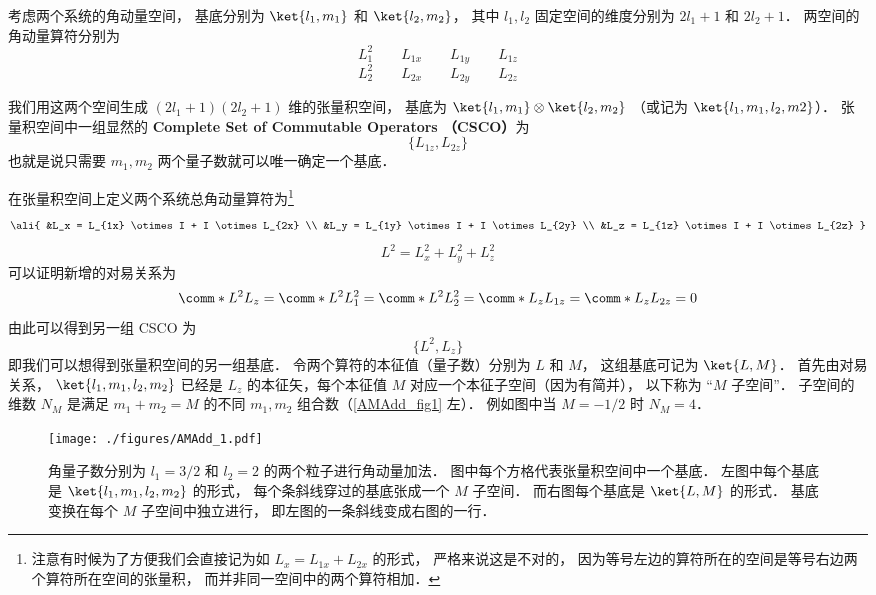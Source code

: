 

考虑两个系统的角动量空间， 基底分别为 $\ket{l_1, m_1}$ 和 $\ket{l_2, m_2}$， 其中 $l_1, l_2$ 固定空间的维度分别为 $2l_1+1$ 和 $2l_2+1$． 两空间的角动量算符分别为
\begin{equation}\label{AMAdd_eq1}
L_1^2 \qquad L_{1x} \qquad L_{1y} \qquad L_{1z}
\end{equation}
\begin{equation}\label{AMAdd_eq7}
L_2^2 \qquad L_{2x} \qquad L_{2y} \qquad L_{2z}
\end{equation}

我们用这两个空间生成 $(2l_1+1)(2l_2+1)$ 维的张量积空间， 基底为 $\ket{l_1, m_1}\otimes\ket{l_2, m_2}$ （或记为 $\ket{l_1, m_1, l_2, m2}$）． 张量积空间中一组显然的 \textbf{Complete Set of Commutable Operators （CSCO）}为 %
\begin{equation}
\{L_{1z}, L_{2z}\}
\end{equation}
也就是说只需要 $m_1, m_2$ 两个量子数就可以唯一确定一个基底．

在张量积空间上定义两个系统总角动量算符为\footnote{注意有时候为了方便我们会直接记为如 $L_x = L_{1x} + L_{2x}$ 的形式， 严格来说这是不对的， 因为等号左边的算符所在的空间是等号右边两个算符所在空间的张量积， 而并非同一空间中的两个算符相加．}
\begin{equation}\ali{
&L_x = L_{1x} \otimes I +  I \otimes L_{2x} \\
&L_y = L_{1y} \otimes I +  I \otimes L_{2y} \\
&L_z = L_{1z} \otimes I +  I \otimes L_{2z}
}\end{equation}
\begin{equation}
L^2 = L_x^2 + L_y^2 + L_z^2
\end{equation}
可以证明新增的对易关系为
\begin{equation}
\comm*{L^2}{L_z} = \comm*{L^2}{L_1^2} = \comm*{L^2}{L_2^2} = 
\comm*{L_z}{L_{1z}} = \comm*{L_z}{L_{2z}} = 0
\end{equation}
由此可以得到另一组 CSCO 为 %
\begin{equation}
\{L^2, L_z\}
\end{equation}
即我们可以想得到张量积空间的另一组基底． 令两个算符的本征值（量子数）分别为 $L$  和 $M$， 这组基底可记为 $\ket{L, M}$．  首先由对易关系， $\ket{l_1, m_1, l_2, m_2}$ 已经是 $L_z$ 的本征矢，每个本征值 $M$ 对应一个本征子空间（因为有简并）， 以下称为 “$M$ 子空间”． 子空间的维数 $N_M$ 是满足 $m_1 + m_2 = M$ 的不同 $m_1,m_2$ 组合数（\autoref{AMAdd_fig1} 左）． 例如图中当 $M = -1/2$ 时 $N_M = 4$．
\begin{figure}[ht]
\centering
\texttt{[image: ./figures/AMAdd\_1.pdf]}
\caption{角量子数分别为 $l_1 = 3/2$ 和 $l_2 = 2$ 的两个粒子进行角动量加法． 图中每个方格代表张量积空间中一个基底． 左图中每个基底是 $\ket{l_1, m_1, l_2, m_2}$ 的形式， 每个条斜线穿过的基底张成一个 $M$ 子空间． 而右图每个基底是 $\ket{L, M}$ 的形式． 基底变换在每个 $M$ 子空间中独立进行， 即左图的一条斜线变成右图的一行．} \label{AMAdd_fig1}
\end{figure}

